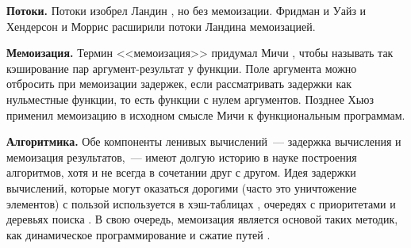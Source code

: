 \noindent
\textbf{Потоки.} Потоки изобрел Ландин \cite{Landin1965}, но без
мемоизации. Фридман и Уайз \cite{FriedmanWise1976} и Хендерсон и
Моррис \cite{HendersonMorris1976} расширили потоки Ландина
мемоизацией.

\noindent
\textbf{Мемоизация.} Термин <<мемоизация>> придумал Мичи
\cite{Michie1968}, чтобы называть так кэширование пар
аргумент-результат у функции. Поле аргумента можно отбросить при мемоизации
задержек, если рассматривать задержки как нульместные функции, то
есть функции с нулем аргументов. Позднее Хьюз \cite{Hughes1985}
применил мемоизацию в исходном смысле Мичи к функциональным
программам.

\noindent
\textbf{Алгоритмика.} Обе компоненты ленивых вычислений~--- задержка
вычисления и мемоизация результатов,~--- имеют долгую историю в науке
построения алгоритмов, хотя и не всегда в сочетании друг с
другом. Идея задержки вычислений, которые могут оказаться дорогими
(часто это уничтожение элементов) с пользой используется в
хэш-таблицах \cite{vanWykVitter1986}, очередях с приоритетами
\cite{SleatorTarjan1986b, FredmanTarjan1987} и деревьях поиска
\cite{Driscoll-etal1989}. В свою очередь, мемоизация является основой
таких методик, как динамическое программирование \cite{Bellman1957} и
сжатие путей \cite{HopcroftUllman1973, TarjanvanLeeuwen1984}.

